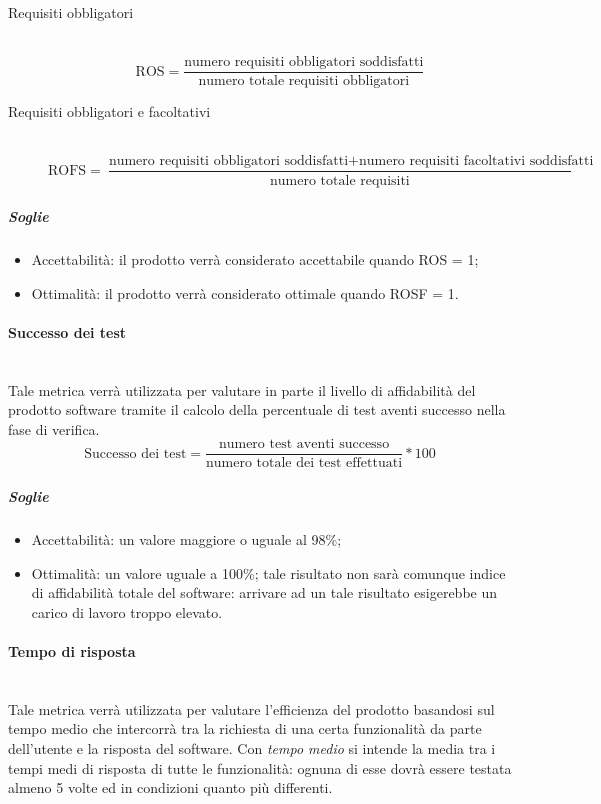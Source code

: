 \begin{description}
\item[Requisiti obbligatori]
	~\\ \begin{displaymath}
		\mbox{ROS}=\frac{\mbox{numero requisiti obbligatori soddisfatti}}{\mbox{numero totale requisiti obbligatori}}
	\end{displaymath}
	
\item[Requisiti obbligatori e facoltativi]
	~\\ \begin{displaymath}
		\mbox{ROFS}=\frac{\mbox{numero requisiti obbligatori soddisfatti} + \mbox{numero requisiti facoltativi soddisfatti}}{\mbox{numero totale requisiti}}
	\end{displaymath}
\end{description}

\subparagraph{Soglie}
\begin{itemize}
\item Accettabilità: il prodotto verrà considerato accettabile quando ROS = 1;
\item Ottimalità: il prodotto verrà considerato ottimale quando ROSF = 1.
\end{itemize}

\paragraph{Successo dei test}
\label{AppB:Affidabilita}
	~\\Tale metrica verrà utilizzata per valutare in parte il livello di affidabilità del prodotto software tramite il calcolo della percentuale di test aventi successo nella fase di verifica.
	\begin{displaymath}
		\mbox{Successo dei test}=\frac{\mbox{numero test aventi successo}}{\mbox{numero totale dei test effettuati}} * 100
	\end{displaymath}
	
	\subparagraph{Soglie}
	\begin{itemize}
	\item Accettabilità: un valore maggiore o uguale al 98\%;
	\item Ottimalità: un valore uguale a 100\%; tale risultato non sarà comunque indice di affidabilità totale del software: arrivare ad un tale risultato esigerebbe un carico di lavoro troppo elevato.
	\end{itemize}
	
\paragraph{Tempo di risposta}
\label{AppB:Efficienza}
	~\\Tale metrica verrà utilizzata per valutare l'efficienza del prodotto basandosi sul tempo medio che intercorrà tra la richiesta di una certa funzionalità da parte dell'utente e la risposta del software. Con \textit{tempo medio} si intende la media tra i tempi medi di risposta di tutte le funzionalità: ognuna di esse dovrà essere testata almeno 5 volte ed in condizioni quanto più differenti.
	
